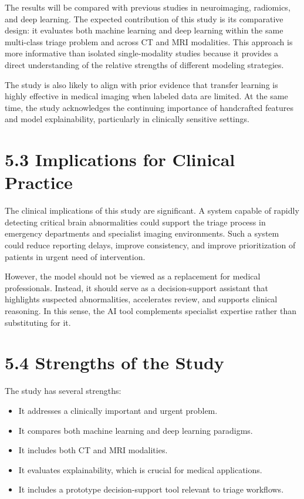 \documentclass[12pt,a4paper]{report}
\begin{document}
The results will be compared with previous studies in neuroimaging, radiomics, and deep learning. The expected contribution of this study is its comparative design: it evaluates both machine learning and deep learning within the same multi-class triage problem and across CT and MRI modalities. This approach is more informative than isolated single-modality studies because it provides a direct understanding of the relative strengths of different modeling strategies.

The study is also likely to align with prior evidence that transfer learning is highly effective in medical imaging when labeled data are limited. At the same time, the study acknowledges the continuing importance of handcrafted features and model explainability, particularly in clinically sensitive settings.

\section{5.3 Implications for Clinical Practice}

The clinical implications of this study are significant. A system capable of rapidly detecting critical brain abnormalities could support the triage process in emergency departments and specialist imaging environments. Such a system could reduce reporting delays, improve consistency, and improve prioritization of patients in urgent need of intervention.

However, the model should not be viewed as a replacement for medical professionals. Instead, it should serve as a decision-support assistant that highlights suspected abnormalities, accelerates review, and supports clinical reasoning. In this sense, the AI tool complements specialist expertise rather than substituting for it.

\section{5.4 Strengths of the Study}

The study has several strengths:

\begin{itemize}
\item It addresses a clinically important and urgent problem.
\item It compares both machine learning and deep learning paradigms.
\item It includes both CT and MRI modalities.
\item It evaluates explainability, which is crucial for medical applications.
\item It includes a prototype decision-support tool relevant to triage workflows.
\end{itemize}
\end{document}
